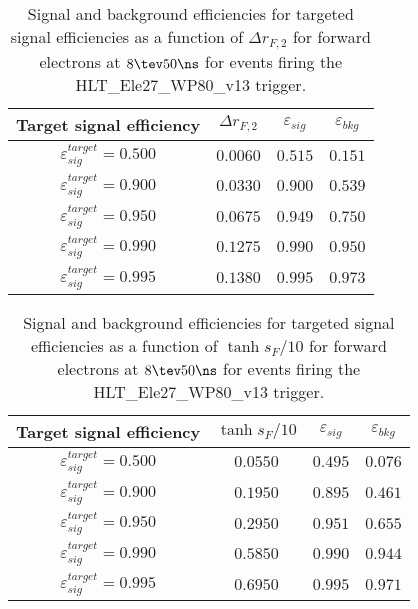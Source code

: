 \clearpage

\begin{table}[!bht]
  \begin{center}
    \begin{tabular}{cccc}
      \hline
      Target signal efficiency & $\Delta r_{F,2}$ & $\varepsilon_{sig}$ & $\varepsilon_{bkg}$ \\ 
      \hline
      $\varepsilon_{sig}^{target} = 0.500$ & $  0.0060$ & $0.515$ & $0.151$ \\
      $\varepsilon_{sig}^{target} = 0.900$ & $  0.0330$ & $0.900$ & $0.539$ \\
      $\varepsilon_{sig}^{target} = 0.950$ & $  0.0675$ & $0.949$ & $0.750$ \\
      $\varepsilon_{sig}^{target} = 0.990$ & $  0.1275$ & $0.990$ & $0.950$ \\
      $\varepsilon_{sig}^{target} = 0.995$ & $  0.1380$ & $0.995$ & $0.973$ \\
      \hline
    \end{tabular}
    \caption{Signal and background efficiencies for targeted signal efficiencies as a function of $\Delta r_{F,2}$ for forward electrons at $8\tev 50\ns$ for events firing the HLT\_Ele27\_WP80\_v13 trigger.}
    \label{tab:eff_rej_r2F_beam_8_50_trigger_27_F}
  \end{center}
\end{table}

\clearpage

\begin{table}[!bht]
  \begin{center}
    \begin{tabular}{cccc}
      \hline
      Target signal efficiency & $\tanh{s_F/10}$ & $\varepsilon_{sig}$ & $\varepsilon_{bkg}$ \\ 
      \hline
      $\varepsilon_{sig}^{target} = 0.500$ & $  0.0550$ & $0.495$ & $0.076$ \\
      $\varepsilon_{sig}^{target} = 0.900$ & $  0.1950$ & $0.895$ & $0.461$ \\
      $\varepsilon_{sig}^{target} = 0.950$ & $  0.2950$ & $0.951$ & $0.655$ \\
      $\varepsilon_{sig}^{target} = 0.990$ & $  0.5850$ & $0.990$ & $0.944$ \\
      $\varepsilon_{sig}^{target} = 0.995$ & $  0.6950$ & $0.995$ & $0.971$ \\
      \hline
    \end{tabular}
    \caption{Signal and background efficiencies for targeted signal efficiencies as a function of $\tanh{s_F/10}$ for forward electrons at $8\tev 50\ns$ for events firing the HLT\_Ele27\_WP80\_v13 trigger.}
    \label{tab:eff_rej_sF_beam_8_50_trigger_27_F}
  \end{center}
\end{table}

